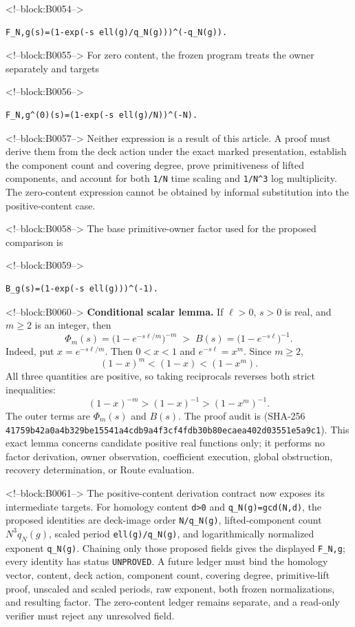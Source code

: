 \documentclass[11pt]{article}
\begin{document}
<!--block:B0054-->
\begin{verbatim}
F_N,g(s)=(1-exp(-s ell(g)/q_N(g)))^(-q_N(g)).
\end{verbatim}

<!--block:B0055-->
For zero content, the frozen program treats the owner separately and
targets

<!--block:B0056-->
\begin{verbatim}
F_N,g^(0)(s)=(1-exp(-s ell(g)/N))^(-N).
\end{verbatim}

<!--block:B0057-->
Neither expression is a result of this article. A proof must derive them from
the deck action under the exact marked presentation, establish the
component count and covering degree, prove primitiveness of lifted
components, and account for both \texttt{1/N} time scaling and
\texttt{1/N\^{}3} log multiplicity. The zero-content expression cannot
be obtained by informal substitution into the positive-content case.

<!--block:B0058-->
The base primitive-owner factor used for the proposed comparison is

<!--block:B0059-->
\begin{verbatim}
B_g(s)=(1-exp(-s ell(g)))^(-1).
\end{verbatim}

<!--block:B0060-->
\begingroup\sloppy
\textbf{Conditional scalar lemma.}  If \(\ell>0\), \(s>0\) is real, and
\(m\geq2\) is an integer, then
\[
 \Phi_m(s)=\bigl(1-e^{-s\ell/m}\bigr)^{-m}
 \;>\;
 B(s)=\bigl(1-e^{-s\ell}\bigr)^{-1}.
\]
Indeed, put \(x=e^{-s\ell/m}\).  Then \(0<x<1\) and
\(e^{-s\ell}=x^m\).  Since \(m\geq2\),
\[
 (1-x)^m<(1-x)<(1-x^m).
\]
All three quantities are positive, so taking reciprocals reverses both strict
inequalities:
\[
 (1-x)^{-m}>(1-x)^{-1}>(1-x^m)^{-1}.
\]
The outer terms are \(\Phi_m(s)\) and \(B(s)\).  The proof audit is
(SHA-256 \texttt{41759b42\allowbreak{}a0a4b329\allowbreak{}be15541a\allowbreak{}4cdb9a4f\allowbreak{}3cf4fdb3\allowbreak{}0b80ecae\allowbreak{}a402d035\allowbreak{}51e5a9c1}).  This exact lemma concerns candidate positive real
functions only; it performs no factor derivation, owner observation, coefficient
execution, global obstruction, recovery determination, or Route evaluation.
\par\endgroup

<!--block:B0061-->
The positive-content derivation contract now exposes its intermediate
targets. For homology content \texttt{d>0} and
\texttt{q\_N(g)=gcd(N,d)}, the proposed identities are deck-image order
\texttt{N/q\_N(g)}, lifted-component count
\(N^3 q_N(g)\), scaled period \texttt{ell(g)/q\_N(g)}, and logarithmically
normalized exponent \texttt{q\_N(g)}. Chaining only those proposed fields
gives the displayed \texttt{F\_N,g}; every identity has status
\texttt{UNPROVED}. A future ledger must bind the homology vector, content, deck
action, component count, covering degree, primitive-lift proof, unscaled and
scaled periods, raw exponent, both frozen normalizations, and resulting factor.
The zero-content ledger remains separate, and a read-only verifier must reject
any unresolved field.
\end{document}
